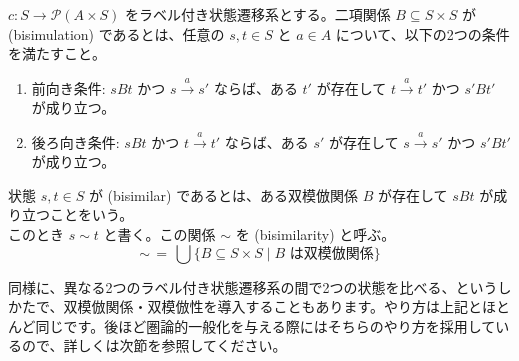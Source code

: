 \documentclass[
		head_space=20mm,
		foot_space=20mm,
		gutter=10mm,
		line_length=190mm
]{jlreq}
\begin{document}
\begin{definition}
	$c:S\to\mathcal P(A\times S)$ をラベル付き状態遷移系とする。二項関係 $B\subseteq S\times S$ が (bisimulation) であるとは、任意の $s,t\in S$ と $a\in A$ について、以下の2つの条件を満たすこと。
	\begin{enumerate}
		\item 前向き条件: $sBt$ かつ $s\xrightarrow{a}s'$ ならば、ある $t'$ が存在して $t\xrightarrow{a} t'$ かつ $s'Bt'$ が成り立つ。
		\begin{center}\small
		\end{center}
		\item 後ろ向き条件: $sBt$ かつ $t\xrightarrow{a}t'$ ならば、ある $s'$ が存在して $s\xrightarrow{a}s'$ かつ $s'Bt'$ が成り立つ。
		\begin{center}\small
		\end{center}
	\end{enumerate}
	状態 $s,t\in S$ が (bisimilar) であるとは、ある双模倣関係 $B$ が存在して $sBt$ が成り立つことをいう。\\ このとき $s\sim t$ と書く。この関係 $\sim$ を (bisimilarity) と呼ぶ。
	\[{\sim}\,=\,\bigcup\{B\subseteq S\times S\mid\textrm{$B$ は双模倣関係}\}\]
\end{definition}

\begin{supplement}
	同様に、異なる2つのラベル付き状態遷移系の間で2つの状態を比べる、というしかたで、双模倣関係・双模倣性を導入することもあります。やり方は上記とほとんど同じです。後ほど圏論的一般化を与える際にはそちらのやり方を採用しているので、詳しくは次節を参照してください。
\end{supplement}
\end{document}
